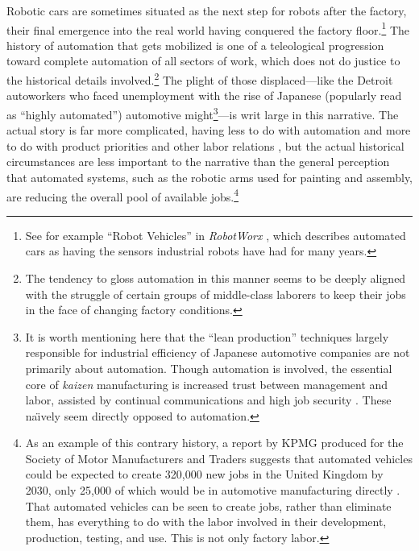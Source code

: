 Robotic cars are sometimes situated as
the next step for robots after the factory, their final emergence into
the real world having conquered the factory floor.\footnote{See for
  example ``Robot Vehicles'' in \emph{RobotWorx} \cite{robotworx}, which describes automated cars as having the sensors
  industrial robots have had for many years.} The history of
automation that gets mobilized is one of a teleological progression
toward complete automation of all sectors of work, which does not do
justice to the historical details involved.\footnote{The tendency to gloss
automation in this manner seems
to be deeply aligned with the struggle of certain groups of
middle-class laborers to keep their jobs in the face of changing
factory conditions.} The plight of those displaced---like the Detroit
autoworkers who faced unemployment with the rise of
Japanese (popularly read as ``highly automated'') automotive
might\footnote{It is worth mentioning here that the ``lean
  production'' techniques largely responsible for industrial
  efficiency of Japanese automotive companies are not primarily about
  automation. Though automation is involved, the essential core of
  \emph{kaizen} manufacturing is increased trust between management
  and labor, assisted by continual communications and high job
  security \cite[p. 198--199]{nyeAmericas}. These na\"{\i}vely seem
  directly opposed to automation.}---is writ large in this narrative.
The actual story 
is far more complicated, having less to do with automation and more to
do with product priorities and other labor
relations \cite[p. 188--200]{nyeAmericas}, but the actual historical
circumstances are less important to the narrative than the general
perception that automated 
systems, such as the robotic arms used for painting and assembly, are
reducing the overall pool of available jobs.\footnote{As an example of
  this contrary history, a report by KPMG produced for the Society of Motor
Manufacturers and Traders suggests that automated vehicles could be
expected to create 320,000 new jobs in the United Kingdom by 2030, only 25,000 of
which would be in automotive manufacturing directly
\cite{toveyCreate}.
That automated vehicles can be seen to create jobs, rather than
eliminate them, has everything to do with the labor involved in their
development, production, testing, and use. This is not only
factory labor.}


